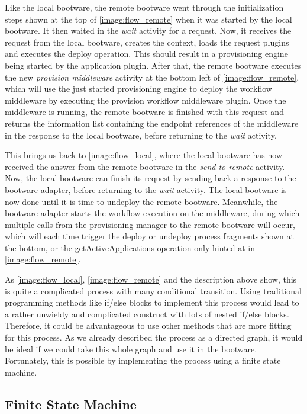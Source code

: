Like the local bootware, the remote bootware went through the initialization steps shown at the top of \autoref{image:flow_remote} when it was started by the local bootware.
It then waited in the \textit{wait} activity for a request.
Now, it receives the request from the local bootware, creates the context, loads the request plugins and executes the deploy operation.
This should result in a provisioning engine being started by the application plugin.
After that, the remote bootware executes the new \textit{provision middleware} activity at the bottom left of \autoref{image:flow_remote}, which will use the just started provisioning engine to deploy the workflow middleware by executing the provision workflow middleware plugin.
Once the middleware is running, the remote bootware is finished with this request and returns the information list containing the endpoint references of the middleware in the response to the local bootware, before returning to the \textit{wait} activity.

This brings us back to \autoref{image:flow_local}, where the local bootware has now received the answer from the remote bootware in the \textit{send to remote} activity.
Now, the local bootware can finish its request by sending back a response to the bootware adapter, before returning to the \textit{wait} activity.
The local bootware is now done until it is time to undeploy the remote bootware.
Meanwhile, the bootware adapter starts the workflow execution on the middleware, during which multiple calls from the provisioning manager to the remote bootware will occur, which will each time trigger the deploy or undeploy process fragments shown at the bottom, or the getActiveApplications operation only hinted at in \autoref{image:flow_remote}.

As \autoref{image:flow_local}, \autoref{image:flow_remote} and the description above show, this is quite a complicated process with many conditional transition.
Using traditional programming methods like if/else blocks to implement this process would lead to a rather unwieldy and complicated construct with lots of nested if/else blocks.
Therefore, it could be advantageous to use other methods that are more fitting for this process.
As we already described the process as a directed graph, it would be ideal if we could take this whole graph and use it in the bootware.
Fortunately, this is possible by implementing the process using a finite state machine.

\subsection{Finite State Machine}

